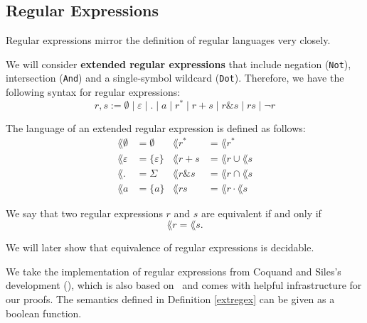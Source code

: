    \subsection{Regular Expressions}

     
    Regular expressions mirror the definition of regular languages very closely. 
    \begin{definition}
        \label{extregex}
    We will consider \textbf{extended regular expressions} that include negation (\lstinline{Not}), intersection (\lstinline{And}) and a single-symbol wildcard (\lstinline{Dot}). 
    Therefore, we have the following syntax for regular expressions:
    \begin{equation*}
        r,s := \emptyset \; | \; \varepsilon \; | \; . \; | \; a \; | \; r^* \; | \; r + s \; | \; r \& s \; | \; r s \; | \; \neg r
    \end{equation*}
        

     
    The language of an extended regular expression is defined as follows:
    \begin{align*}
        \lang{\emptyset} & = \emptyset
        & 
        \lang{r^*} & = \lang{r}^* \\
        \lang{\varepsilon} & = \{\varepsilon\}
        & 
        \lang{r + s} & = \lang{r} \cup \lang{s} \\
        \lang{.} & = \Sigma
        & 
        \lang{r \& s} & = \lang{r} \cap \lang{s} \\
        \lang{a} & = \{a\}
        &
        \lang{r s} & = \lang{r} \cdot \lang{s}
    \end{align*}
    \end{definition}

    \begin{definition}
        We say that two regular expressions $r$ and $s$ are equivalent if and only if
        \begin{equation*}
            \lang{r} = \lang{s}.
        \end{equation*}
    \end{definition}
    We will later show that equivalence of regular expressions is decidable.

    
    
    We take the implementation of regular expressions from Coquand and Siles's development (\cite{DBLP:conf/cpp/CoquandS11}), which is also based on \ssreflect\ and comes with helpful infrastructure for our proofs.
    The semantics defined in Definition \ref{extregex} can be given as a boolean function.
    


